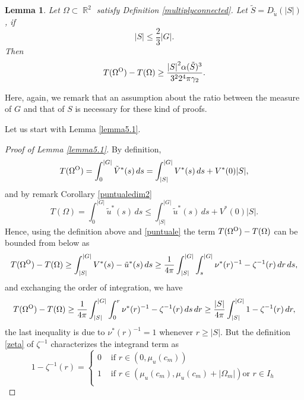 \documentclass[oneside,a4paper,11pt,notitlepage]{article}
\newcommand{\abs}[1]{{\left|#1\right|}}
\theoremstyle{definition}
\theoremstyle{plain}
\newtheorem{lemma}[theorem]{Lemma}
\theoremstyle{definition}
\DeclareMathOperator{\R}{\mathbb{R}}
\newcommand{\OO}{\text{\normalfont  O}}
\begin{document}
\begin{lemma}\label{lemma5.2}
	Let $\Omega\subset\R^2$ satisfy Definition \ref{multiplyconnected}. Let $\tilde{S}=D_{\tilde u}(\abs{S})$, if
    \[\abs{S}\leq\frac{2}{3}\abs{G}.\]
    Then 
    \begin{equation*}
    T(\Omega^\OO)-T(\Omega) \geq \frac{\abs{S}^2\alpha(\tilde{S})^3}{3^22^4\pi \gamma_ 2}.
\end{equation*}
\end{lemma}
Here, again, we remark that an assumption about the ratio between the measure of $G$ and that of $S$ is necessary for these kind of proofs.

Let us start with Lemma \ref{lemma5.1}. 

\begin{proof}[Proof of Lemma \ref{lemma5.1}]
	By definition, \begin{equation*}      T(\Omega^\OO)=\int_0^\abs{G}\tilde V^\ast(s)\,ds=\int_\abs{S}^\abs{G}V^\ast(s)\,ds+V^\ast(0)\abs{S},
	\end{equation*}
	and by remark  Corollary \ref{puntualedim2}
	\begin{equation*}
		T(\Omega)=\int_0^\abs{G}\tilde u^\ast(s)\,ds\leq \int_\abs{S}^\abs{G}\tilde u^\ast(s)\,ds+V^\ast(0)\abs{S}.
	\end{equation*}
	Hence, using the definition above and \eqref{puntuale} the term $T(\Omega^\OO)-T(\Omega)$ can be bounded from below as
	\begin{equation*}
		T(\Omega^\OO)-T(\Omega)\geq\int_\abs{S}^\abs{G}V^\ast(s)-\tilde u^\ast(s)\,ds\geq \frac{1}{4\pi}\int_\abs{S}^\abs{G}\int_s^\abs{G} \nu^\ast(r)^{-1}-\zeta^{-1}(r)\,dr\,ds,
	\end{equation*}
	and exchanging the order of integration, we have
	\begin{equation}
    \label{28}
		T(\Omega^\OO)-T(\Omega)\geq\frac{1}{4\pi}\int_\abs{S}^\abs{G}\int_0^r
		\nu^\ast(r)^{-1}-\zeta^{-1}(r)\,ds\,dr\geq\frac{\abs{S}}{4\pi}\int_\abs{S}^\abs{G}1-\zeta^{-1}(r)\,dr,
	\end{equation}
	the last inequality is due to $\nu^\ast(r)^{-1}=1$ whenever $r\geq\abs{S}$. But the definition \eqref{zeta} of $\zeta^{-1}$ characterizes the integrand term as
	\begin{equation*}%
		1-\zeta^{-1}(r)=\begin{cases}
			\displaystyle{0} & \text{ if } r\in\left(0,\mu_u(c_m)\right)\\
			\displaystyle{1} & \text{ if } r\in\left(\mu_u(c_m),\mu_u(c_m)+|\Omega_m|\right) \text{or }r\in I_h\\

\end{cases}
\end{equation*}
\end{proof}
\end{document}
